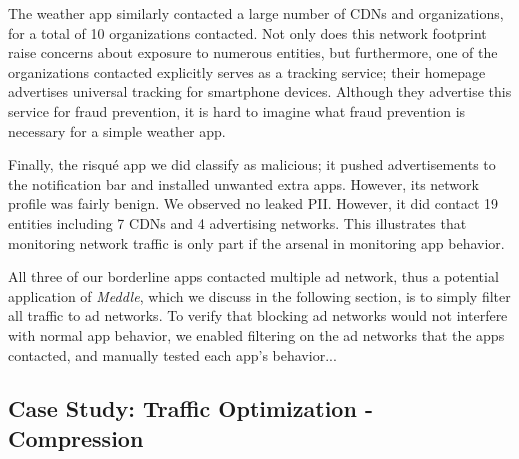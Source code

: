     The weather app similarly contacted a large number of CDNs and organizations, for a total of 10 organizations contacted.
    Not only does this network footprint raise concerns about exposure to numerous entities, but furthermore, one of the organizations contacted explicitly serves as a tracking service; their homepage advertises universal tracking for smartphone devices.
    Although they advertise this service for fraud prevention, it is hard to imagine what fraud prevention is necessary for a simple weather app.

    Finally, the risqu\'{e} app we did classify as malicious; it pushed advertisements to the notification bar and installed unwanted extra apps.
    However, its network profile was fairly benign.
    We observed no leaked PII. However, it did contact 19 entities including 7 CDNs and 4 advertising networks.
    This illustrates that monitoring network traffic is only part if the arsenal in monitoring app behavior.

    All three of our borderline apps contacted multiple ad network, thus a potential application of {\it Meddle}, which we discuss in the following section, is to simply filter all traffic to ad networks.
    To verify that blocking ad networks would not interfere with normal app behavior, we enabled filtering on the ad networks that the apps contacted, and manually tested each app's behavior...

\subsection{Case Study: Traffic Optimization - Compression}
\label{sec:case-study-compression}









 




